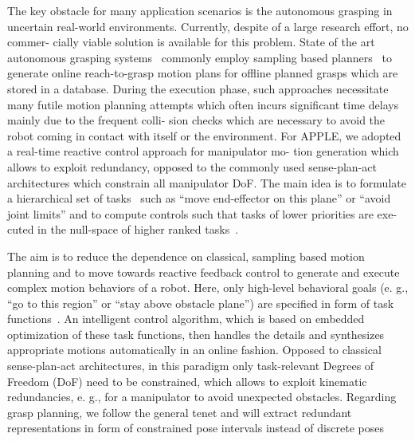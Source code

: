 












The key obstacle for many application scenarios is the autonomous grasping in uncertain real-world
environments. Currently, despite of a large research effort, no commer- cially viable solution is
available for this problem. State of the art autonomous grasping systems~\cite{Bere07, Srin10,
  Krug14a} commonly employ sampling based planners~\cite{LaVa06} to generate online reach-to-grasp
motion plans for offline planned grasps which are stored in a database.  During the execution phase,
such approaches necessitate many futile motion planning attempts which often incurs significant time
delays mainly due to the frequent colli- sion checks which are necessary to avoid the robot coming
in contact with itself or the environment.  For APPLE, we adopted a real-time reactive control
approach for manipulator mo- tion generation which allows to exploit redundancy, opposed to the
commonly used sense-plan-act architectures which constrain all manipulator DoF. The main idea is to
formulate a hierarchical set of tasks~\cite{Sams91} such as “move end-effector on this plane” or
“avoid joint limits” and to compute controls such that tasks of lower priorities are exe- cuted in
the null-space of higher ranked tasks~\cite{Sici91, Sent10}.

The aim is to reduce the dependence on classical, sampling based motion planning and to move towards
reactive feedback control to generate and execute complex motion behaviors of a robot.  Here, only
high-level behavioral goals (e. g., “go to this region” or “stay above obstacle plane”) are
specified in form of task functions~\cite{Sams91}. An intelligent control algorithm, which is based
on embedded optimization of these task functions, then handles the details and synthesizes
appropriate motions automatically in an online fashion. Opposed to classical sense-plan-act
architectures, in this paradigm only task-relevant Degrees of Freedom (DoF) need to be constrained,
which allows to exploit kinematic redundancies, e. g., for a manipulator to avoid unexpected
obstacles. Regarding grasp planning, we follow the general tenet and will extract redundant
representations in form of constrained pose intervals instead of discrete poses
